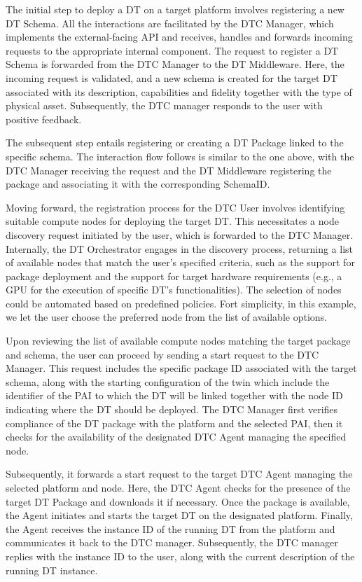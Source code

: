 The initial step to deploy a DT on a target platform involves registering a new DT Schema.
%
All the interactions are facilitated by the DTC Manager, which implements the external-facing API and receives, handles and forwards incoming requests to the appropriate internal component.
%
The request to register a DT Schema is forwarded from the DTC Manager to the DT Middleware. Here, the incoming request is validated, and a new schema is created for the target DT associated with its description, capabilities and fidelity together with the type of physical asset. Subsequently, the DTC manager responds to the user with positive feedback.

The subsequent step entails registering or creating a DT Package linked to the specific schema. The interaction flow follows is similar to the one above, with the DTC Manager receiving the request and the DT Middleware registering the package and associating it with the corresponding SchemaID. 

Moving forward, the registration process for the DTC User involves identifying suitable compute nodes for deploying the target DT. This necessitates a node discovery request initiated by the user, which is forwarded to the DTC Manager.
%
Internally, the DT Orchestrator engages in the discovery process, returning a list of available nodes that match the user's specified criteria, such as the support for package deployment and the support for target hardware requirements (e.g., a GPU for the execution of specific DT's functionalities).
%
The selection of nodes could be automated based on predefined policies. Fort simplicity, in this example, we let the user choose the preferred node from the list of available options.

Upon reviewing the list of available compute nodes matching the target package and schema, the user can proceed by sending a start request to the DTC Manager.
%
This request includes the specific package ID associated with the target schema, along with the starting configuration of the twin which include the identifier of the PAI to which the \ac{DT} will be linked together with the node ID indicating where the DT should be deployed. 
The DTC Manager first verifies compliance of the \ac{DT} package with the platform and the selected PAI, then it checks for the availability of the designated DTC Agent managing the specified node.

Subsequently, it forwards a start request to the target DTC Agent managing the selected platform and node.
%
Here, the DTC Agent checks for the presence of the target DT Package and downloads it if necessary. Once the package is available, the Agent initiates and starts the target DT on the designated platform.
%
Finally, the Agent receives the instance ID of the running DT from the platform and communicates it back to the DTC manager. Subsequently, the DTC manager replies with the instance ID to the user, along with the current description of the running DT instance.


